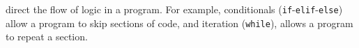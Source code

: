  direct the flow of logic in a program. For example,
conditionals (\texttt{if}-\texttt{elif}-\texttt{else}) allow a program to skip sections of code, and iteration (\texttt{while}), allows a program to repeat a section.

